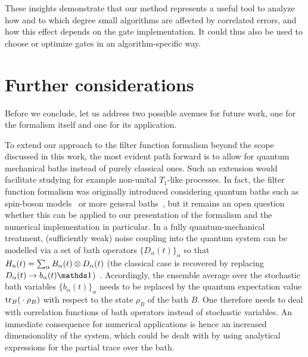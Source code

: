 These insights demonstrate that our method represents a useful tool to analyze how and to which degree small algorithms are affected by correlated errors, and how this effect depends on the gate implementation.
It could thus also be used to choose or optimize gates in an algorithm-specific way.

\chapter{Further considerations}\label{ch:ff:considerata}
Before we conclude, let us address two possible avenues for future work, one for the formalism itself and one for its application.

To extend our approach to the filter function formalism beyond the scope discussed in this work, the most evident path forward is to allow for quantum mechanical baths instead of purely classical ones.
Such an extension would facilitate studying for example non-unital $T_1$-like processes.
In fact, the filter function formalism was originally introduced considering quantum baths such as spin-boson models~\cite{Martinis2003,Uhrig2007} or more general baths~\cite{Kofman2001,Yuge2011,Paz-Silva2017}, but it remains an open question whether this can be applied to our presentation of the formalism and the numerical implementation in particular.
In a fully quantum-mechanical treatment, (sufficiently weak) noise coupling into the quantum system can be modelled via a set of bath operators $\{D_\alpha(t)\}_\alpha$ so that $H_{\mathrm{n}}(t) = \sum_\alpha B_\alpha(t)\otimes D_\alpha(t)$ (the classical case is recovered by replacing $D_\alpha(t)\rightarrow b_\alpha(t)\eye$)~\cite{Breuer2007}.
Accordingly, the ensemble average over the stochastic bath variables $\{b_\alpha(t)\}_\alpha$ needs to be replaced by the quantum expectation value $\tr_B(\:\cdot\:\rho_B)$ with respect to the state $\rho_B$ of the bath $B$.
One therefore needs to deal with correlation functions of bath operators instead of stochastic variables.
An immediate consequence for numerical applications is hence an increased dimensionality of the system, which could be dealt with by using analytical expressions for the partial trace over the bath.

